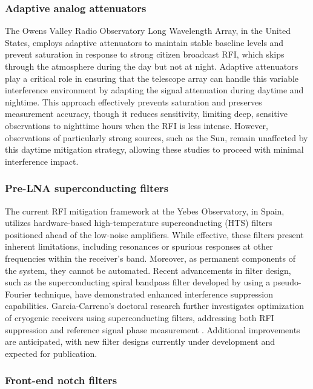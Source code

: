 \subsubsection{Adaptive analog attenuators}

The Owens Valley Radio Observatory Long Wavelength Array, in the United States, employs adaptive attenuators to maintain stable baseline levels and prevent saturation in response to strong citizen broadcast RFI, which skips through the atmosphere during the day but not at night. Adaptive attenuators play a critical role in ensuring that the telescope array can handle this variable interference environment by adapting the signal attenuation during daytime and nightime. This approach effectively prevents saturation and preserves measurement accuracy, though it reduces sensitivity, limiting deep, sensitive observations to nighttime hours when the RFI is less intense. However, observations of particularly strong sources, such as the Sun, remain unaffected by this daytime mitigation strategy, allowing these studies to proceed with minimal interference impact.

\subsubsection{Pre-LNA superconducting filters}
The current RFI mitigation framework at the Yebes Observatory, in Spain, utilizes hardware-based high-temperature superconducting (HTS) filters positioned ahead of the low-noise amplifiers. While effective, these filters present inherent limitations, including resonances or spurious responses at other frequencies within the receiver’s band. Moreover, as permanent components of the system, they cannot be automated. Recent advancements in filter design, such as the superconducting spiral bandpass filter developed by \citep{huang2018superconducting} using a pseudo-Fourier technique, have demonstrated enhanced interference suppression capabilities. Garcia-Carreno’s doctoral research further investigates optimization of cryogenic receivers using superconducting filters, addressing both RFI suppression and reference signal phase measurement \citep{huang2018superconducting}. Additional improvements are anticipated, with new filter designs currently under development and expected for publication.

\subsubsection{Front-end notch filters}

